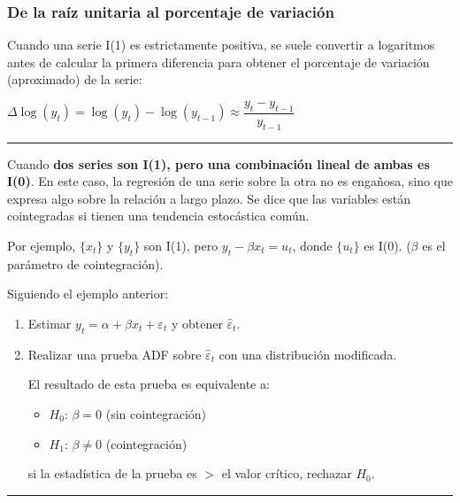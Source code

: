 \begin{f}
	
	
	\subsubsection*{De la raíz unitaria al porcentaje de variación}
	
	Cuando una serie I(1) es estrictamente positiva, se suele convertir a logaritmos antes de calcular la primera diferencia para obtener el porcentaje de variación (aproximado) de la serie:
	
	\begin{center}
		\(\Delta \log(y_{t}) = \log(y_{t}) - \log(y_{t - 1}) \approx \dfrac{y_t - y_{t - 1}} {y_{t - 1}}\)
	\end{center}
	
\end{f}  \hrule

\begin{f}[Cointegración]
	
	Cuando \textbf{dos series son I(1), pero una combinación lineal de ambas es I(0)}. En este caso, la regresión de una serie sobre la otra no es engañosa, sino que expresa algo sobre la relación a largo plazo. Se dice que las variables están cointegradas si tienen una tendencia estocástica común.
	
	Por ejemplo, \(\lbrace x_{t} \rbrace\) y \(\lbrace y_{t} \rbrace\) son I(1), pero \(y_{t} - \beta x_{t} = u_{t}\), donde \(\lbrace u_{t} \rbrace\) es I(0). (\(\beta\) es el parámetro de cointegración).
	
\end{f}  

\begin{f}
	
	Siguiendo el ejemplo anterior:
	
	\begin{enumerate}[leftmargin=*]
		\item Estimar \(y_{t} = \alpha + \beta x_{t} + \varepsilon_{t}\) y obtener \(\hat{\varepsilon}_{t}\).
		\item Realizar una prueba ADF sobre \(\hat{\varepsilon}_{t}\) con una distribución modificada.
		
		El resultado de esta prueba es equivalente a:
		
		\begin{itemize}[leftmargin=*]
			\item \(H_{0}\): \(\beta = 0\) (sin cointegración)
			\item \(H_{1}\): \(\beta \neq 0\) (cointegración)
		\end{itemize}
		
		si la estadística de la prueba es \(>\) el valor crítico, rechazar \(H_0\).
	\end{enumerate}
	
\end{f}  \hrule


